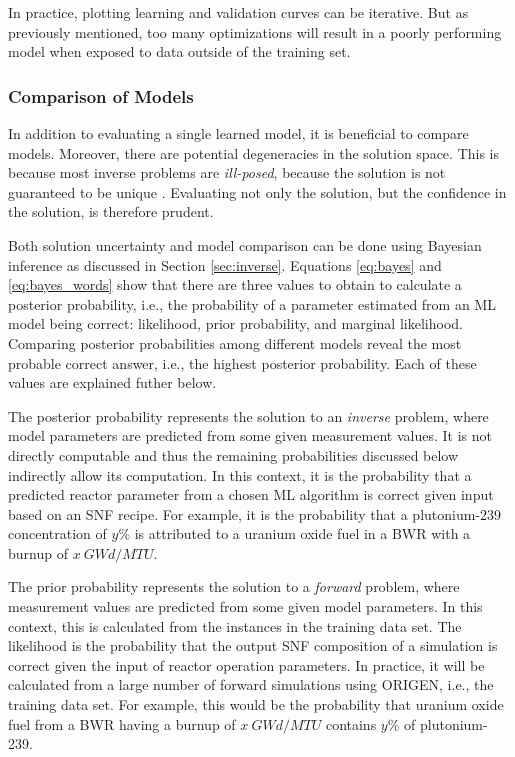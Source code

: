 In practice, plotting learning and validation curves can be iterative. But as
previously mentioned, too many optimizations will result in a poorly performing
model when exposed to data outside of the training set.

\subsubsection{Comparison of Models}
\label{sec:invcompare}

In addition to evaluating a single learned model, it is beneficial to compare
models. Moreover, there are potential degeneracies in the solution space. This
is because most inverse problems are \textit{ill-posed}, because the solution
is not guaranteed to be unique \cite{skutnik_2016}.  Evaluating not only the
solution, but the confidence in the solution, is therefore prudent.

Both solution uncertainty and model comparison can be done using Bayesian
inference as discussed in Section \ref{sec:inverse}.  Equations \ref{eq:bayes}
and \ref{eq:bayes_words} show that there are three values to obtain to
calculate a posterior probability, i.e., the probability of a parameter
estimated from an \gls{ML} model being correct: likelihood, prior
probability, and marginal likelihood.  Comparing posterior probabilities among
different models reveal the most probable correct answer, i.e., the highest
posterior probability.  \cite{inverse_theory, gentle_bayes} Each of these
values are explained futher below.

The posterior probability represents the solution to an \textit{inverse}
problem, where model parameters are predicted from some given measurement
values. It is not directly computable and thus the remaining probabilities
discussed below indirectly allow its computation.  In this context, it is the
probability that a predicted reactor parameter from a chosen \gls{ML}
algorithm is correct given input based on an \gls{SNF} recipe.  For example, it
is the probability that a plutonium-239 concentration of $y\%$ is attributed to
a uranium oxide fuel in a \gls{BWR} with a burnup of $x\ GWd/MTU$.  

The prior probability represents the solution to a \textit{forward} problem,
where measurement values are predicted from some given model parameters.  In
this context, this is calculated from the instances in the training data set.
The likelihood is the probability that the output \gls{SNF} composition of a
simulation is correct given the input of reactor operation parameters.  In
practice, it will be calculated from a large number of forward simulations
using \gls{ORIGEN}, i.e., the training data set. For example, this would be the
probability that uranium oxide fuel from a \gls{BWR} having a burnup of $x\
GWd/MTU$ contains $y\%$ of plutonium-239.

